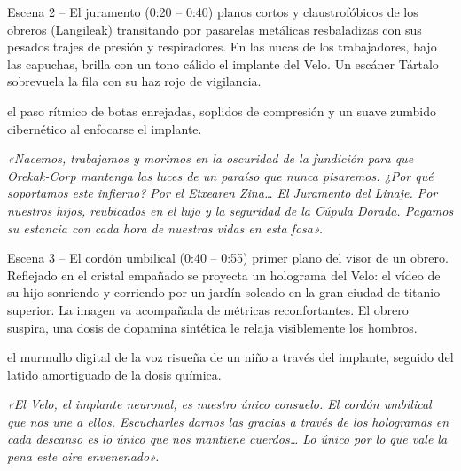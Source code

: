 \begin{CajaCinematica}{Escena 2 -- El juramento (0:20 -- 0:40)}
 planos cortos y claustrofóbicos de los obreros (Langileak) transitando por pasarelas metálicas resbaladizas con sus pesados trajes de presión y respiradores. En las nucas de los trabajadores, bajo las capuchas, brilla con un tono cálido el implante del Velo. Un escáner Tártalo sobrevuela la fila con su haz rojo de vigilancia.\par
{} el paso rítmico de botas enrejadas, soplidos de compresión y un suave zumbido cibernético al enfocarse el implante.\par
{}\par
\textit{«Nacemos, trabajamos y morimos en la oscuridad de la fundición para que Orekak-Corp mantenga las luces de un paraíso que nunca pisaremos. ¿Por qué soportamos este infierno? Por el Etxearen Zina\ldots{} El Juramento del Linaje. Por nuestros hijos, reubicados en el lujo y la seguridad de la Cúpula Dorada. Pagamos su estancia con cada hora de nuestras vidas en esta fosa».}
\end{CajaCinematica}

\begin{CajaCinematica}{Escena 3 -- El cordón umbilical (0:40 -- 0:55)}
 primer plano del visor de un obrero. Reflejado en el cristal empañado se proyecta un holograma del Velo: el vídeo de su hijo sonriendo y corriendo por un jardín soleado en la gran ciudad de titanio superior. La imagen va acompañada de métricas reconfortantes. El obrero suspira, una dosis de dopamina sintética le relaja visiblemente los hombros.\par
{} el murmullo digital de la voz risueña de un niño a través del implante, seguido del latido amortiguado de la dosis química.\par
{}\par
\textit{«El Velo, el implante neuronal, es nuestro único consuelo. El cordón umbilical que nos une a ellos. Escucharles darnos las gracias a través de los hologramas en cada descanso es lo único que nos mantiene cuerdos\ldots{} Lo único por lo que vale la pena este aire envenenado».}
\end{CajaCinematica}

